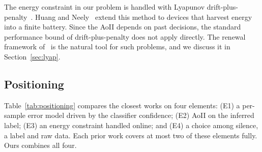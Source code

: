 \documentclass[5p,twocolumn]{elsarticle}
\theoremstyle{remark}
\begin{document}
The energy constraint in our problem is handled with Lyapunov drift-plus-penalty~\cite{neely2010book}. Huang and Neely~\cite{huang2013eh} extend this method to devices that harvest energy into a finite battery. Since the AoII depends on past decisions, the standard performance bound of drift-plus-penalty does not apply directly. The renewal framework of~\cite{neely2013renewal} is the natural tool for such problems, and we discuss it in Section~\ref{sec:lyap}.

\subsection{Positioning}
Table~\ref{tab:positioning} compares the closest works on four elements: (E1) a per-sample error model driven by the classifier confidence; (E2) AoII on the inferred label; (E3) an energy constraint handled online; and (E4) a choice among silence, a label and raw data. Each prior work covers at most two of these elements fully. Ours combines all four.

\begin{table}[t]
\caption{Positioning against the closest works. \checkmark: covered; $\circ$: partly covered; --: not covered.}
\label{tab:positioning}
\centering\footnotesize
\setlength{\tabcolsep}{3pt}
\end{table}
\end{document}
